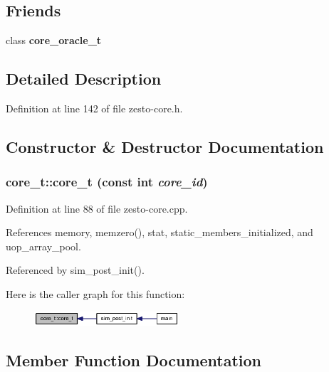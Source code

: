 \subsection*{Friends}
\begin{CompactItemize}
\item 
class {\bf core\_\-oracle\_\-t}
\end{CompactItemize}


\subsection{Detailed Description}


Definition at line 142 of file zesto-core.h.

\subsection{Constructor \& Destructor Documentation}
\subsubsection[{core\_\-t}]{\setlength{\rightskip}{0pt plus 5cm}core\_\-t::core\_\-t (const int {\em core\_\-id})}\label{classcore__t_5bc9e3784ebc125c92ac3d84e0aed88a}




Definition at line 88 of file zesto-core.cpp.

References memory, memzero(), stat, static\_\-members\_\-initialized, and uop\_\-array\_\-pool.

Referenced by sim\_\-post\_\-init().

Here is the caller graph for this function:\nopagebreak
\begin{figure}[H]
\begin{center}
\leavevmode
\includegraphics[width=152pt]{classcore__t_5bc9e3784ebc125c92ac3d84e0aed88a_icgraph}
\end{center}
\end{figure}


\subsection{Member Function Documentation}
